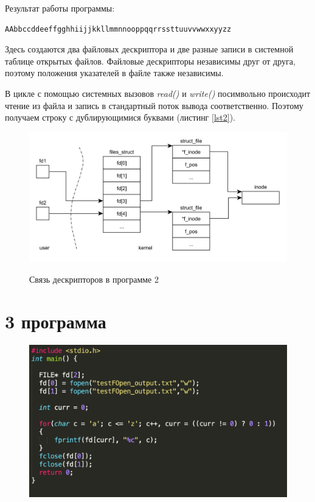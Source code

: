 \documentclass[a4paper,12pt]{article}
\begin{document}
	Результат работы программы:
	
	\begin{lstlisting}[label = lst2, caption = Результат testKernelIO.out]
	AAbbccddeeffgghhiijjkkllmmnnooppqqrrssttuuvvwwxxyyzz
	\end{lstlisting}
	
	Здесь создаются два файловых дескриптора и две разные записи в системной таблице открытых файлов. Файловые дескрипторы независимы друг от друга, поэтому положения указателей в файле также независимы.
	
	В цикле с помощью системных вызовов \textit{read()} и \textit{write()} посимвольно происходит чтение из файла и запись в стандартный поток вывода соответственно.
	Поэтому получаем строку с дублирующимися буквами (листинг \ref{lst2}).
	
	\newpage
		
	\begin{figure}[h!]
		\begin{center}
			{\includegraphics[scale = 0.7]{page2.png}}
			\label{ris:page2}
		\end{center}
		\caption{Связь дескрипторов в программе 2}
	\end{figure}
		
	\newpage
		
	\section*{3 программа}
	
	\begin{figure}[h!]
		\begin{center}
			{\includegraphics[scale = 0.7]{testFopen.png}}
			\label{ris:testFopen}
		\end{center}
	\end{figure}
	
\end{document}
